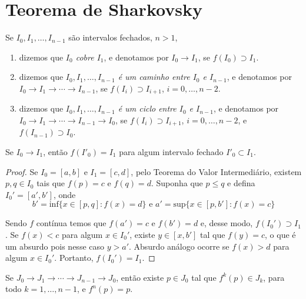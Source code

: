 \section{Teorema de Sharkovsky}

\begin{definition}
Se $I_0, I_1, \dots, I_{n-1}$ são intervalos fechados, $n > 1$,
\begin{enumerate}
\item dizemos que \textit{$I_0$ cobre $I_1$}, e denotamos por $I_0 \longrightarrow I_1$, se $f(I_0) \supset I_1$.

\item dizemos  que \textit{$I_0, I_1, \dots, I_{n-1}$ é um caminho entre $I_0$ e $I_{n-1}$}, e denotamos por $I_0 \longrightarrow I_1 \longrightarrow \cdots \longrightarrow I_{n-1}$, se $f(I_i) \supset I_{i+1}$, $i = 0, \dots, n-2$.

\item dizemos  que \textit{$I_0, I_1, \dots, I_{n-1}$ é um ciclo entre $I_0$ e $I_{n-1}$}, e denotamos por $I_0 \longrightarrow I_1 \longrightarrow \cdots \longrightarrow I_{n-1} \longrightarrow I_0$, se $f(I_i) \supset I_{i+1}$, $i = 0, \dots, n-2$, e $f(I_{n-1}) \supset I_0$.

\end{enumerate}
\end{definition}

\begin{lemma}
Se $I_0 \longrightarrow I_1$, então $f(I'_0) = I_1$ para algum intervalo fechado $I'_0 \subset I_1$.
\end{lemma}
\begin{proof}
Se $I_0 = [a, b]$ e $I_1 = [c, d]$, pelo Teorema do Valor Intermediário, existem $p, q \in I_0$ tais que $f(p) = c$ e $f(q) = d$. Suponha que $p \leq q$ e defina $I_0' = [a', b']$, onde
$$b' = \textrm{inf}\{x \in [p, q] : f(x) = d\} \textrm{ e } a' = \textrm{sup}\{x \in [p, b'] : f(x) = c\}$$

Sendo $f$ contínua temos que $f(a') = c$ e $f(b') = d$ e, desse modo, $f(I_0') \supset I_1$. Se $f(x) < c$ para algum $x \in I_0'$, existe $y \in [x, b']$ tal que $f(y) = c$, o que é um absurdo pois nesse caso $y > a'$. Absurdo análogo ocorre se $f(x) > d$ para algum $x \in I_0'$. Portanto, $f(I_0') = I_1$.
\end{proof}

\begin{lemma}
Se $J_0 \longrightarrow J_1 \longrightarrow \cdots \longrightarrow J_{n-1} \longrightarrow J_0$, então existe $p \in J_0$ tal que $f^k(p) \in J_k$, para todo $k = 1, \dots, n-1$, e $f^n(p) = p$.
\end{lemma}

